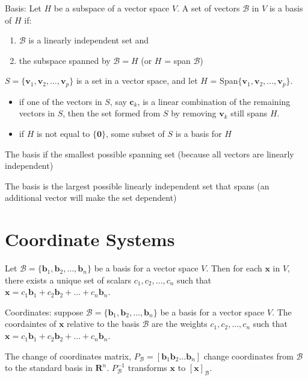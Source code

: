 \documentclass[../linalg.tex]{subfiles}
\begin{document}
Basis: Let $H$ be a subspace of a vector space $V$. A set of vectors $\mathcal{B}$ in $V$ is a basis of $H$ if:
\begin{enumerate}
    \item $\mathcal{B}$ is a linearly independent set and 
    \item the subspace spanned by $\mathcal{B}=H$ (or $H$ = span $\mathcal{B}$)
\end{enumerate}

\begin{theorem}
    $S=\{\textbf{v}_1,\textbf{v}_2,\dots,\textbf{v}_p\}$ is a set in a vector space, and let $H$ = Span$\{\textbf{v}_1,\textbf{v}_2,\dots,\textbf{v}_p\}$.
    \begin{itemize}
        \item if one of the vectors in $S$, say $\textbf{c}_k$, is a linear combination of the remaining vectors in $S$, then the set formed from $S$ by removing $\textbf{v}_k$ still spans $H$.
        \item if $H$ is not equal to $\{\textbf{0}\}$, some subset of $S$ is a basis for $H$
    \end{itemize}
\end{theorem}

The basis if the smallest possible spanning set (because all vectors are linearly independent)

The basis is the largest possible linearly independent set that spans (an additional vector will make the set dependent)



\section{Coordinate Systems}
\begin{theorem}
    Let $\mathcal{B}=\{\textbf{b}_1,\textbf{b}_2,\dots,\textbf{b}_n\}$ be a basis for a vector space $V$. Then for each $\textbf{x}$ in $V$, there exists a unique set of scalars $c_1,c_2,\dots, c_n$ such that $\textbf{x}=c_1\textbf{b}_1+c_2\textbf{b}_2+\dots+c_n\textbf{b}_n$.
\end{theorem}
Coordinates: suppose $\mathcal{B}=\{\textbf{b}_1,\textbf{b}_2,\dots,\textbf{b}_n\}$ be a basis for a vector space $V$. The coordaintes of $\textbf{x}$ relative to the basis $\mathcal{B}$ are the weights $c_1,c_2,\dots,c_n$ such that $\textbf{x}=c_1\textbf{b}_1+c_2\textbf{b}_2+\dots+c_n\textbf{b}_n$.

The change of coordinates matrix, $P_{\mathcal{B}}=[\textbf{b}_1 \textbf{b}_2 \dots \textbf{b}_n]$ change coordinates from $\mathcal{B}$ to the standard basis in $\textbf{R}^n$.
$P_{\mathcal{B}}^{-1}$ transforms $\textbf{x}$ to $[\textbf{x}]_{\mathcal{B}}$.
\end{document}
